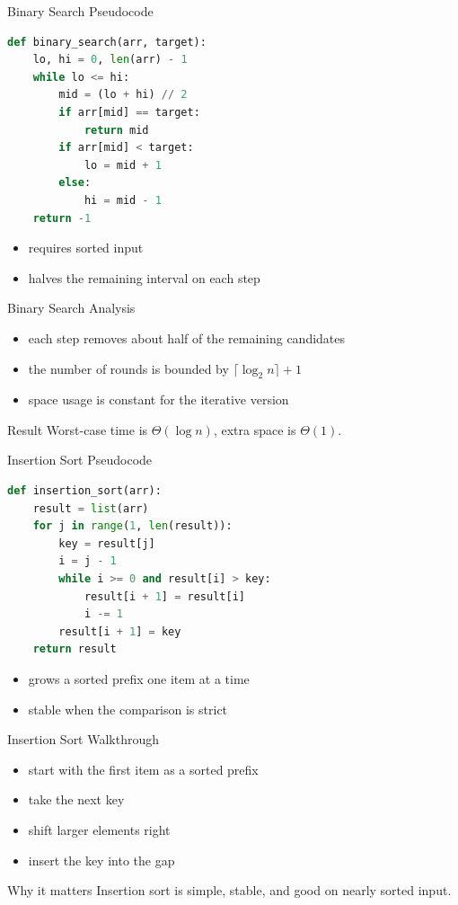 \documentclass[aspectratio=169,xcolor=dvipsnames]{beamer}
\begin{document}
\begin{frame}[fragile]{Binary Search Pseudocode}
  \begin{lstlisting}[language=Python]
def binary_search(arr, target):
    lo, hi = 0, len(arr) - 1
    while lo <= hi:
        mid = (lo + hi) // 2
        if arr[mid] == target:
            return mid
        if arr[mid] < target:
            lo = mid + 1
        else:
            hi = mid - 1
    return -1
  \end{lstlisting}
  \begin{itemize}
    \item requires sorted input
    \item halves the remaining interval on each step
  \end{itemize}
\end{frame}

\begin{frame}{Binary Search Analysis}
  \begin{itemize}
    \item each step removes about half of the remaining candidates
    \item the number of rounds is bounded by $\lceil \log_2 n \rceil + 1$
    \item space usage is constant for the iterative version
  \end{itemize}
  \begin{block}{Result}
    Worst-case time is $\Theta(\log n)$, extra space is $\Theta(1)$.
  \end{block}
\end{frame}

\begin{frame}[fragile]{Insertion Sort Pseudocode}
  \begin{lstlisting}[language=Python]
def insertion_sort(arr):
    result = list(arr)
    for j in range(1, len(result)):
        key = result[j]
        i = j - 1
        while i >= 0 and result[i] > key:
            result[i + 1] = result[i]
            i -= 1
        result[i + 1] = key
    return result
  \end{lstlisting}
  \begin{itemize}
    \item grows a sorted prefix one item at a time
    \item stable when the comparison is strict
  \end{itemize}
\end{frame}

\begin{frame}{Insertion Sort Walkthrough}
  \begin{itemize}
    \item start with the first item as a sorted prefix
    \item take the next key
    \item shift larger elements right
    \item insert the key into the gap
  \end{itemize}
  \begin{block}{Why it matters}
    Insertion sort is simple, stable, and good on nearly sorted input.
  \end{block}
\end{frame}
\end{document}
